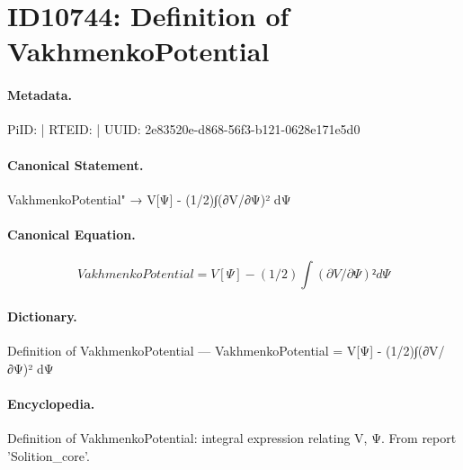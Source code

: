 \section*{ID10744: Definition of VakhmenkoPotential}
\paragraph{Metadata.}
PiID:  | RTEID:  | UUID: 2e83520e-d868-56f3-b121-0628e171e5d0

\paragraph{Canonical Statement.}
VakhmenkoPotential" → V[Ψ] - (1/2)∫(∂V/∂Ψ)² dΨ

\paragraph{Canonical Equation.}
\[
VakhmenkoPotential = V[Ψ] - (1/2)∫(∂V/∂Ψ)² dΨ
\]

\paragraph{Dictionary.}
Definition of VakhmenkoPotential — VakhmenkoPotential = V[Ψ] - (1/2)∫(∂V/∂Ψ)² dΨ

\paragraph{Encyclopedia.}
Definition of VakhmenkoPotential: integral expression relating V, Ψ. From report 'Solition\_core'.
